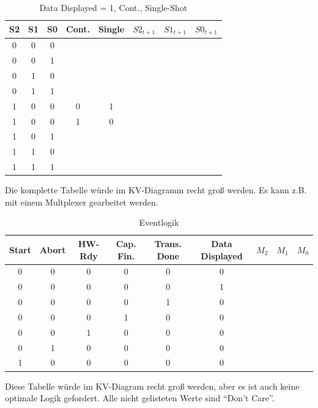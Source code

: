 \documentclass[a4paper]{scrartcl}
\begin{document}
\begin{table}[h]
  \centering
  \begin{tabular}{ccccc|ccc}
    S2 & S1 & S0 & Cont. & Single & $S2_{t+1}$ & $S1_{t+1}$ & $S0_{t+1}$\\ \hline
    0&0&0& & & &&\\
    0&0&1& & & &&\\
    0&1&0& & & &&\\
    0&1&1& & & &&\\
    1&0&0 & 0 & 1 & & & \\
    1&0&0 & 1 & 0 & & & \\
    1&0&1& & & &&\\
    1&1&0& & & &&\\
    1&1&1& & & &&\\
    
  \end{tabular}
  \caption{Data Displayed = 1, Cont., Single-Shot}
Die komplette Tabelle würde im KV-Diagramm recht groß werden. Es kann z.B. mit einem Multplexer gearbeitet werden. 
\end{table}

\begin{table}[h]
  \centering
  \begin{tabular}{cccccc|ccc}
    Start & Abort & HW-Rdy & Cap. Fin. & Trans. Done & Data Displayed & $M_2$ & $M_1$ & $M_0$\\ \hline
    0 & 0 & 0 & 0 & 0 & 0 & & &\\
    0 & 0 & 0 & 0 & 0 & 1 & & &\\
    0 & 0 & 0 & 0 & 1 & 0 & & &\\
    0 & 0 & 0 & 1 & 0 & 0 & & &\\
    0 & 0 & 1 & 0 & 0 & 0 & & &\\
    0 & 1 & 0 & 0 & 0 & 0 & & &\\
    1 & 0 & 0 & 0 & 0 & 0 & & &\\ 
  \end{tabular}
  \caption{Eventlogik}
Diese Tabelle würde im KV-Diagram recht groß werden, aber es ist auch keine optimale Logik gefordert. Alle nicht gelisteten Werte sind ``Don't Care''.
\end{table}
\end{document}

